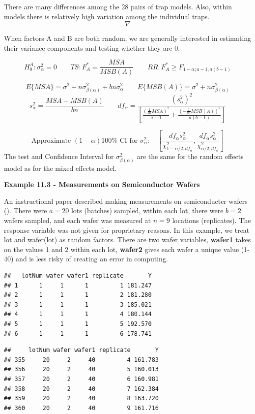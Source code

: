 \documentclass[
]{book}
\begin{document}
There are many differences among the 28 pairs of trap models. Also,
within models there is relatively high variation among the individual
traps. \[ \nabla \]

When factors A and B are both random, we are generally interested in
estimating their variance components and testing whether they are 0.

\[
H_0^A:\sigma_{\alpha}^2=0  \qquad
TS:F_A^*=\frac{MSA}{MSB(A)} \qquad
RR:F_A^* \geq F_{1-\alpha;a-1,a(b-1)}
\]

\[
E\{MSA\}=\sigma^2 + n\sigma_{\beta(\alpha)}^2 + bn\sigma_{\alpha}^2
\qquad 
E\{MSB(A)\}=\sigma^2 + n\sigma_{\beta(\alpha)}^2
\] \[
s_{\alpha}^2 = \frac{MSA-MSB(A)}{bn}
\qquad
df_{\alpha}=\frac{\left(s_{\alpha}^2\right)^2}{
\left[\frac{\left(\frac{1}{bn}MSA\right)^2}{a-1} +
\frac{\left(-\frac{1}{bn}MSB(A)\right)^2}{a(b-1)} \right]
}
\]

\[
\mbox{Approximate } (1-\alpha)100\% \mbox{ CI for }
\sigma_{\alpha}^2: \quad
\left[
\frac{df_{\alpha}s_{\alpha}^2}{
\chi_{1-\alpha/2; df_{\alpha}}^2},
\frac{df_{\alpha}s_{\alpha}^2}{
\chi_{\alpha/2; df_{\alpha}}^2}
\right]
\] The test and Confidence Interval for \(\sigma_{\beta(\alpha)}^2\) are
the same for the random effects model as for the mixed effects model.

\textbf{Example 11.3 - Measurements on Semiconductor Wafers}

An instructional paper described making measurements on semiconducter
wafers (). There were \(a=20\)
lots (batches) sampled, within each lot, there were \(b=2\) wafers
sampled, and each wafer was measured at \(n=9\) locations (replicates).
The response variable was not given for proprietary reasons. In this
example, we treat lot and wafer(lot) as random factors. There are two
wafer variables, \textbf{wafer1} takes on the values 1 and 2 within each
lot, \textbf{wafer2} gives each wafer a unique value (1-40) and is less
risky of creating an error in computing.

\begin{verbatim}
##   lotNum wafer wafer1 replicate       Y
## 1      1     1      1         1 181.247
## 2      1     1      1         2 181.280
## 3      1     1      1         3 185.021
## 4      1     1      1         4 180.144
## 5      1     1      1         5 192.570
## 6      1     1      1         6 178.741
\end{verbatim}

\begin{verbatim}
##     lotNum wafer wafer1 replicate       Y
## 355     20     2     40         4 161.783
## 356     20     2     40         5 160.013
## 357     20     2     40         6 160.981
## 358     20     2     40         7 162.384
## 359     20     2     40         8 163.720
## 360     20     2     40         9 161.716
\end{verbatim}
\end{document}
